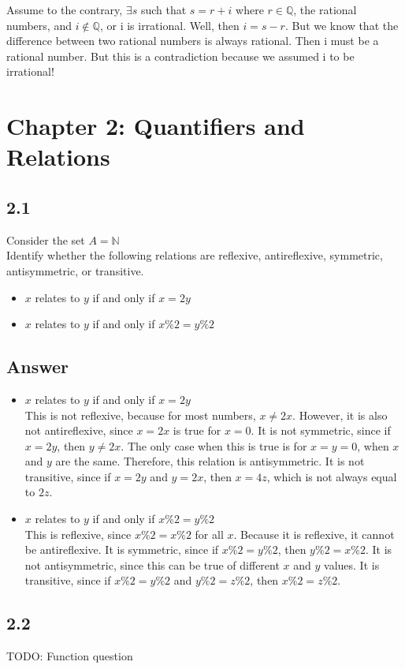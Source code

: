 \documentclass{article}
\begin{document}
Assume to the contrary, $\exists s$ such that $s = r + i$ where $r \in \mathbb{Q}$, the rational numbers, and $i \notin \mathbb{Q}$, or i is irrational.
Well, then $i = s - r$. But we know that the difference between two rational numbers is always rational. Then i must be a rational number. But this is a contradiction
because we assumed i to be irrational! 
\newpage
\section*{Chapter 2: Quantifiers and Relations}
\subsection*{2.1}
Consider the set $A=\mathbb{N}$
\\ Identify whether the following relations are reflexive, antireflexive, symmetric, antisymmetric, or transitive.
\begin{itemize}
    \item $x$ relates to $y$ if and only if $x=2y$ 
    \item $x$ relates to $y$ if and only if $x\%2=y\%2$
\end{itemize}
\newpage
\subsection*{Answer}
\begin{itemize}
    \item $x$ relates to $y$ if and only if $x=2y$
    \\ This is not reflexive, because for most numbers, $x\neq 2x$. However, it is also not antireflexive, since $x=2x$ is true for $x=0$. It is not symmetric, since if $x=2y$, then $y\neq2x$. The only case when this is true is for $x=y=0$, when $x$ and $y$ are the same. Therefore, this relation is antisymmetric. It is not transitive, since if $x=2y$ and $y=2x$, then $x=4z$, which is not always equal to $2z$.
    \item $x$ relates to $y$ if and only if $x\%2=y\%2$
    \\ This is reflexive, since $x\%2=x\%2$ for all $x$. Because it is reflexive, it cannot be antireflexive. It is symmetric, since if $x\%2=y\%2$, then   $y\%2=x\%2$. It is not antisymmetric, since this can be true of different $x$ and $y$ values. It is transitive, since if $x\%2=y\%2$ and $y\%2=z\%2$, then $x\%2=z\%2$.
\end{itemize}
\newpage
\subsection*{2.2}
TODO: Function question
\end{document}
